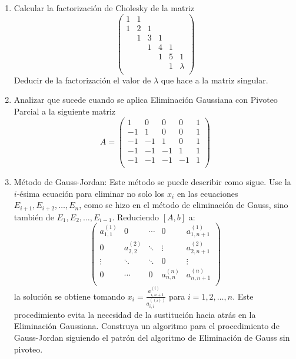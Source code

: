 \documentclass[12pt,letterpaper]{article}
\theoremstyle{plain}
\begin{document}
\begin{enumerate}
\item Calcular la factorizaci\'on de Cholesky de la matriz
$$
\left( \begin{array}{cccccc}
         1 & 1 &   &   &   & \\
         1 & 2 & 1 &   &   & \\
           & 1 & 3 & 1 &   & \\
	       &   & 1 & 4 & 1 & \\
	       &   &   & 1 & 5 & 1\\
	       &   &   &   & 1 & \lambda\\
        \end{array}\right)
$$
Deducir de la factorizaci\'on el valor de $\lambda$ que hace a la matriz singular.

\item Analizar que sucede cuando se aplica Eliminaci\'on Gaussiana con Pivoteo Parcial a la siguiente matriz
$$
A=\left( \begin{array}{ccccc}
          1 &  0  &  0 &  0 & 1 \\
         -1 &  1  &  0 &  0 & 1 \\
         -1 & -1  &  1 &  0 & 1 \\
	     -1 & -1  & -1 &  1 & 1 \\
	     -1 & -1  & -1 & -1 & 1 \\
        \end{array}\right)
$$    

\item M\'etodo de Gauss-Jordan: Este m\'etodo se puede describir como sigue. Use la $i$-\'esima
ecuaci\'on para eliminar no solo los $x_i$ en las ecuaciones $E_{i+1},E_{i+2},\ldots,E_n$, como se hizo en el
m\'etodo de eliminaci\'on de Gauss, sino tambi\'en de $E_1,E_2,\ldots,E_{i-1}$. Reduciendo $[A,b]$ a:
$$
\left( \begin{array}{cccc|c}
          a_{1,1}^{(1)} &  0  &  \cdots &  0 & a_{1,n+1}^{(1)} \\
          0 &  a_{2,2}^{(2)}  &  \ddots &  \vdots & a_{2,n+1}^{(2)} \\
         \vdots & \ddots  &  \ddots &  0 & \vdots \\
	     0 & \cdots  & 0 &  a_{n,n}^{(n)} & a_{n,n+1}^{(n)} \\
        \end{array}\right)
$$    
la soluci\'on se obtiene tomando $x_i=\frac{a_{i,n+1}^{(i)}}{a_{i,i}^({(i)})}$ para $i=1,2,\ldots,n$. Este procedimiento evita la necesidad de la sustituci\'on hacia atr\'as en la Eliminaci\'on Gaussiana. Construya un algoritmo para el procedimiento de Gauss-Jordan siguiendo el patr\'on del algoritmo de Eliminaci\'on de Gauss sin pivoteo.


\end{enumerate}
\end{document}
